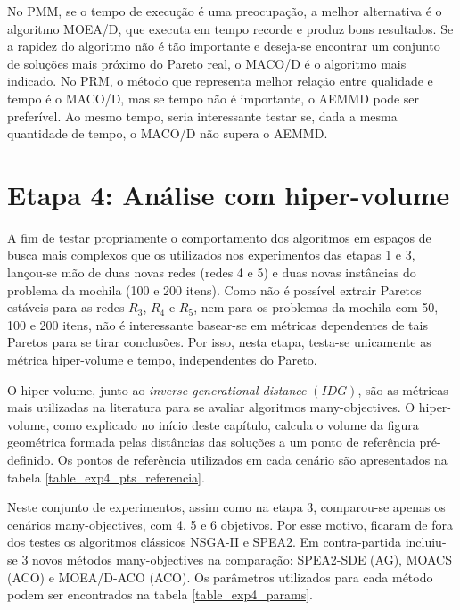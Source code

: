 No PMM, se o tempo de execução é uma preocupação, a melhor alternativa é o algoritmo MOEA/D, que executa em tempo recorde e produz bons resultados. Se a rapidez do algoritmo não é tão importante e deseja-se encontrar um conjunto de soluções mais próximo do Pareto real, o MACO/D é o algoritmo mais indicado. No PRM, o método que representa melhor relação entre qualidade e tempo é o MACO/D, mas se tempo não é importante, o AEMMD pode ser preferível. Ao mesmo tempo, seria interessante testar se, dada a mesma quantidade de tempo, o MACO/D não supera o AEMMD.

\section{Etapa 4: Análise com hiper-volume}
\label{section_experimentos_etapa4}

A fim de testar propriamente o comportamento dos algoritmos em espaços de busca mais complexos que os utilizados nos experimentos das etapas 1 e 3, lançou-se mão de duas novas redes (redes 4 e 5) e duas novas instâncias do problema da mochila (100 e 200 itens). Como não é possível extrair Paretos estáveis para as redes $R_3$, $R_4$ e $R_5$, nem para os problemas da mochila com 50, 100 e 200 itens, não é interessante basear-se em métricas dependentes de tais Paretos para se tirar conclusões. Por isso, nesta etapa, testa-se unicamente as métrica hiper-volume e tempo, independentes do Pareto.

O hiper-volume, junto ao \textit{inverse generational distance} $(IDG)$, são as métricas mais utilizadas na literatura para se avaliar algoritmos many-objectives. O hiper-volume, como explicado no início deste capítulo, calcula o volume da figura geométrica formada pelas distâncias das soluções a um ponto de referência pré-definido. Os pontos de referência utilizados em cada cenário são apresentados na tabela \ref{table_exp4_pts_referencia}.

Neste conjunto de experimentos, assim como na etapa 3, comparou-se apenas os cenários many-objectives, com 4, 5 e 6 objetivos. Por esse motivo, ficaram de fora dos testes os algoritmos clássicos NSGA-II e SPEA2. Em contra-partida incluiu-se 3 novos métodos many-objectives na comparação: SPEA2-SDE (AG), MOACS (ACO) e MOEA/D-ACO (ACO). Os parâmetros utilizados para cada método podem ser encontrados na tabela \ref{table_exp4_params}.

